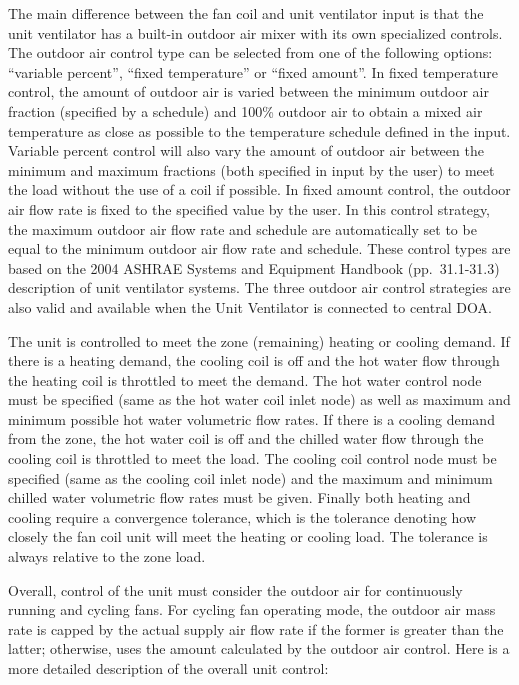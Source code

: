 The main difference between the fan coil and unit ventilator input is that the unit ventilator has a built-in outdoor air mixer with its own specialized controls. The outdoor air control type can be selected from one of the following options: ``variable percent'', ``fixed temperature'' or ``fixed amount''. In fixed temperature control, the amount of outdoor air is varied between the minimum outdoor air fraction (specified by a schedule) and 100\% outdoor air to obtain a mixed air temperature as close as possible to the temperature schedule defined in the input. Variable percent control will also vary the amount of outdoor air between the minimum and maximum fractions (both specified in input by the user) to meet the load without the use of a coil if possible. In fixed amount control, the outdoor air flow rate is fixed to the specified value by the user. In this control strategy, the maximum outdoor air flow rate and schedule are automatically set to be equal to the minimum outdoor air flow rate and schedule. These control types are based on the 2004 ASHRAE Systems and Equipment Handbook (pp.~31.1-31.3) description of unit ventilator systems. The three outdoor air control strategies are also valid and available when the Unit Ventilator is connected to central DOA.

The unit is controlled to meet the zone (remaining) heating or cooling demand. If there is a heating demand, the cooling coil is off and the hot water flow through the heating coil is throttled to meet the demand. The hot water control node must be specified (same as the hot water coil inlet node) as well as maximum and minimum possible hot water volumetric flow rates. If there is a cooling demand from the zone, the hot water coil is off and the chilled water flow through the cooling coil is throttled to meet the load. The cooling coil control node must be specified (same as the cooling coil inlet node) and the maximum and minimum chilled water volumetric flow rates must be given. Finally both heating and cooling require a convergence tolerance, which is the tolerance denoting how closely the fan coil unit will meet the heating or cooling load. The tolerance is always relative to the zone load.

Overall, control of the unit must consider the outdoor air for continuously running and cycling fans. For cycling fan operating mode, the outdoor air mass rate is capped by the actual supply air flow rate if the former is greater than the latter; otherwise, uses the amount calculated by the outdoor air control. Here is a more detailed description of the overall unit control:

